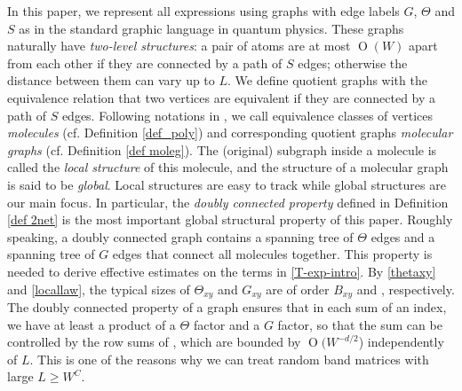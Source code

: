 \documentclass{article}
\newcommand{\1}{\mathds{1}}
\numberwithin{equation}{section}
\renewcommand{\geq}{\geqslant}
\renewcommand{\ge}{\geq}
\DeclareMathOperator{\OO}{O}
\theoremstyle{plain} %
\theoremstyle{remark}
\begin{document}
In this paper, we represent all expressions using  graphs with edge labels  $G$, $\Theta$ and $S$ as in the standard graphic language in quantum physics. These graphs naturally have \emph{two-level structures}: a pair of atoms are at most $\OO(W)$ apart from each other if they are connected by a path of $S$ edges; otherwise the distance between them can vary  up to $L$. We define quotient graphs with the equivalence relation that two vertices are equivalent if they are connected by a path of $S$ edges. Following notations in \cite{PartIII,PartI_high}, we call equivalence classes of vertices \emph{molecules} (cf. Definition \ref{def_poly}) and corresponding quotient graphs \emph{molecular graphs} (cf. Definition \ref{def moleg}). The (original) subgraph inside a molecule is called the {\it local structure} of this molecule, and the structure of a molecular graph is said to be {\it global}. Local structures are easy to track while global structures are our main focus. In particular, the \emph{doubly connected property} defined in Definition \ref{def 2net} is the most important global structural property of this paper. Roughly speaking, a doubly connected graph contains a spanning tree of $\Theta$ edges and a spanning tree of $G$ edges that connect all molecules together. This property is needed to derive effective  estimates on the terms in \eqref{T-exp-intro}. By \eqref{thetaxy} and \eqref{locallaw}, the typical sizes of $\Theta_{xy}$ and $G_{xy}$ are of order $B_{xy}$ and , respectively. The doubly connected property of a graph ensures that in each sum of an index, we have at least a product of a $\Theta$ factor and a $G$ factor, so that the sum can be controlled by the row sums of , which are bounded by $\OO(W^{-d/2}$) independently of $L$. This is one of the reasons why we can treat random band matrices with large $L\ge W^C$. 
\end{document}
